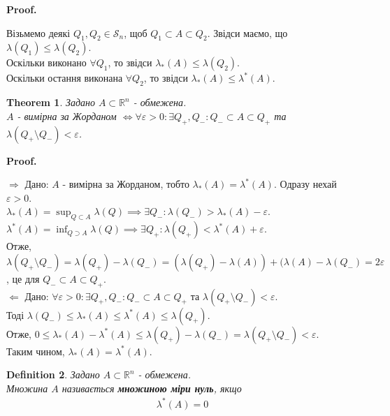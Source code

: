 \documentclass[a4paper, 10pt]{article}
\makeatletter
\def\huge{\displaystyle}
\def\qed{$\blacksquare$}
\def\rightproof{$\boxed{\Rightarrow}$ }
\def\leftproof{$\boxed{\Leftarrow}$ }
\theoremstyle{theoremdd}
\newtheorem{theorem}{Theorem}[subsection]
\theoremstyle{theoremdd}
\newtheorem{definition}[theorem]{Definition}
\theoremstyle{theoremdd}
\theoremstyle{theoremdd}
\theoremstyle{theoremdd}
\theoremstyle{theoremdd}
\theoremstyle{theoremdd}
\theoremstyle{theoremdd}
\renewenvironment{proof}[1][Proof.\\]{\par
\pushQED{\hfill \qed}%
\normalfont \topsep6\p@\@plus6\p@\relax
\trivlist
\item\relax
{\bfseries
#1\@addpunct{.}}\hspace\labelsep\ignorespaces
}{%
\popQED\endtrivlist\@endpefalse
}
\makeatother
\begin{document}
\begin{proof}
Візьмемо деякі $Q_1,Q_2 \in \mathcal{S}_n$, щоб $Q_1 \subset A \subset Q_2$. Звідси маємо, що $\lambda(Q_1) \leq \lambda(Q_2)$.\\
Оскільки виконано $\forall Q_1$, то звідси $\lambda_*(A) \leq \lambda(Q_2)$.\\
Оскільки остання виконана $\forall Q_2$, то звідси $\lambda_*(A) \leq \lambda^*(A)$.
\end{proof}

\begin{theorem}
Задано $A \subset \mathbb{R}^n$ - обмежена.\\
$A$ - вимірна за Жорданом $\iff \forall \varepsilon > 0: \exists Q_+,Q_-: Q_- \subset A \subset Q_+$ та $\lambda(Q_+ \setminus Q_-) < \varepsilon$.
\end{theorem}

\begin{proof}
\rightproof Дано: $A$ - вимірна за Жорданом, тобто $\lambda_*(A) = \lambda^*(A)$. Одразу нехай $\varepsilon > 0$.\\
$\lambda_*(A) = \huge\sup_{Q \subset A} \lambda(Q) \implies \exists Q_-: \lambda(Q_-) > \lambda_*(A) - \varepsilon$.\\
$\lambda^*(A) = \huge\inf_{Q \supset A} \lambda(Q) \implies \exists Q_+: \lambda(Q_+) < \lambda^*(A) + \varepsilon$.\\
Отже, $\lambda(Q_+ \setminus Q_-) = \lambda(Q_+) - \lambda(Q_-) = (\lambda(Q_+)-\lambda(A))+(\lambda(A)-\lambda(Q_-) = 2\varepsilon$, це для $Q_- \subset A \subset Q_+$.
\bigskip \\
\leftproof Дано: $\forall \varepsilon > 0: \exists Q_+,Q_-: Q_- \subset A \subset Q_+$ та $\lambda(Q_+ \setminus Q_-) < \varepsilon$.\\
Тоді $\lambda(Q_-) \leq \lambda_*(A) \leq \lambda^*(A) \leq \lambda(Q_+)$.\\
Отже, $0 \leq \lambda_*(A) - \lambda^*(A) \leq \lambda(Q_+) - \lambda(Q_-) = \lambda(Q_+ \setminus Q_-) < \varepsilon$.\\
Таким чином, $\lambda_*(A) = \lambda^*(A)$.
\end{proof}

\begin{definition}
Задано $A \subset \mathbb{R}^n$ - обмежена.\\
Множина $A$ називається \textbf{множиною міри нуль}, якщо
\begin{align*}
\lambda^*(A) = 0
\end{align*}
\end{definition}
\end{document}
